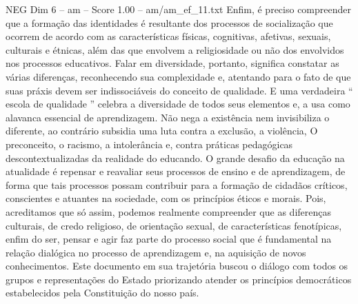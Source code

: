 \begin{textsample}{NEG Dim 6 – am – Score 1.00 – am/am\_ef\_11.txt}
Enfim, é preciso compreender que a formação das identidades é resultante dos processos de socialização que ocorrem de acordo com as características físicas, cognitivas, afetivas, sexuais, culturais e étnicas, além das que envolvem a religiosidade ou não dos envolvidos nos processos educativos.
Falar em diversidade, portanto, significa constatar as várias diferenças, reconhecendo sua complexidade e, atentando para o fato de que suas práxis devem ser indissociáveis do conceito de qualidade.
E uma verdadeira “ escola de qualidade ” celebra a diversidade de todos seus elementos e, a usa como alavanca essencial de aprendizagem.
Não nega a existência nem invisibiliza o diferente, ao contrário subsidia uma luta contra a exclusão, a violência, O preconceito, o racismo, a intolerância e, contra práticas pedagógicas descontextualizadas da realidade do educando.
O grande desafio da educação na atualidade é repensar e reavaliar seus processos de ensino e de aprendizagem, de forma que tais processos possam contribuir para a formação de cidadãos críticos, conscientes e atuantes na sociedade, com os princípios éticos e morais.
Pois, acreditamos que só assim, podemos realmente compreender que as diferenças culturais, de credo religioso, de orientação sexual, de características fenotípicas, enfim do ser, pensar e agir faz parte do processo social que é fundamental na relação dialógica no processo de aprendizagem e, na aquisição de novos conhecimentos.
Este documento em sua trajetória buscou o diálogo com todos os grupos e representações do Estado priorizando atender os princípios democráticos estabelecidos pela Constituição do nosso país.

\end{textsample}
